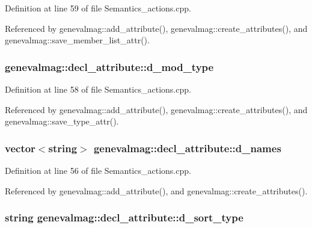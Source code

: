 Definition at line 59 of file Semantics\_\-actions.cpp.

Referenced by genevalmag::add\_\-attribute(), genevalmag::create\_\-attributes(), and genevalmag::save\_\-member\_\-list\_\-attr().\hypertarget{structgenevalmag_1_1decl__attribute_2b7f92bae66963a05669e87a7ccb1810}{
\subsubsection[{d\_\-mod\_\-type}]{ {\bf genevalmag::decl\_\-attribute::d\_\-mod\_\-type}}}
\label{structgenevalmag_1_1decl__attribute_2b7f92bae66963a05669e87a7ccb1810}




Definition at line 58 of file Semantics\_\-actions.cpp.

Referenced by genevalmag::add\_\-attribute(), genevalmag::create\_\-attributes(), and genevalmag::save\_\-type\_\-attr().\hypertarget{structgenevalmag_1_1decl__attribute_c4ea14cc1989803540508a67dc7ff13c}{
\subsubsection[{d\_\-names}]{\setlength{\rightskip}{0pt plus 5cm}vector$<$string$>$ {\bf genevalmag::decl\_\-attribute::d\_\-names}}}
\label{structgenevalmag_1_1decl__attribute_c4ea14cc1989803540508a67dc7ff13c}




Definition at line 56 of file Semantics\_\-actions.cpp.

Referenced by genevalmag::add\_\-attribute(), and genevalmag::create\_\-attributes().\hypertarget{structgenevalmag_1_1decl__attribute_124f1e6a8dc3316c94e8c3c61cc72254}{
\subsubsection[{d\_\-sort\_\-type}]{\setlength{\rightskip}{0pt plus 5cm}string {\bf genevalmag::decl\_\-attribute::d\_\-sort\_\-type}}}
\label{structgenevalmag_1_1decl__attribute_124f1e6a8dc3316c94e8c3c61cc72254}





